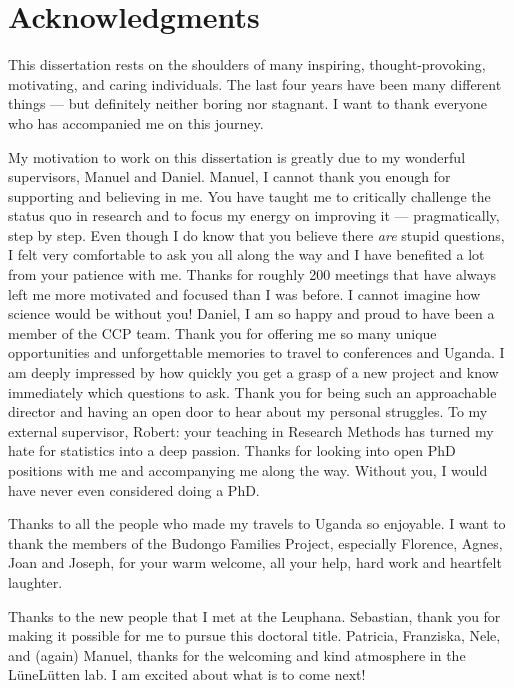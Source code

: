 \documentclass[
]{scrbook}
\begin{document}
\begin{titlepage}
\end{titlepage}

\chapter{Acknowledgments}\label{acknowledgments}

This dissertation rests on the shoulders of many inspiring, thought-provoking, motivating, and caring individuals. The last four years have been many different things --- but definitely neither boring nor stagnant. I want to thank everyone who has accompanied me on this journey.

My motivation to work on this dissertation is greatly due to my wonderful supervisors, Manuel and Daniel. Manuel, I cannot thank you enough for supporting and believing in me. You have taught me to critically challenge the status quo in research and to focus my energy on improving it --- pragmatically, step by step. Even though I do know that you believe there \emph{are} stupid questions, I felt very comfortable to ask you all along the way and I have benefited a lot from your patience with me. Thanks for roughly 200 meetings that have always left me more motivated and focused than I was before. I cannot imagine how science would be without you! Daniel, I am so happy and proud to have been a member of the CCP team. Thank you for offering me so many unique opportunities and unforgettable memories to travel to conferences and Uganda. I am deeply impressed by how quickly you get a grasp of a new project and know immediately which questions to ask. Thank you for being such an approachable director and having an open door to hear about my personal struggles. To my external supervisor, Robert: your teaching in Research Methods has turned my hate for statistics into a deep passion. Thanks for looking into open PhD positions with me and accompanying me along the way. Without you, I would have never even considered doing a PhD.

Thanks to all the people who made my travels to Uganda so enjoyable. I want to thank the members of the Budongo Families Project, especially Florence, Agnes, Joan and Joseph, for your warm welcome, all your help, hard work and heartfelt laughter.

Thanks to the new people that I met at the Leuphana. Sebastian, thank you for making it possible for me to pursue this doctoral title. Patricia, Franziska, Nele, and (again) Manuel, thanks for the welcoming and kind atmosphere in the LüneLütten lab. I am excited about what is to come next!
\end{document}
